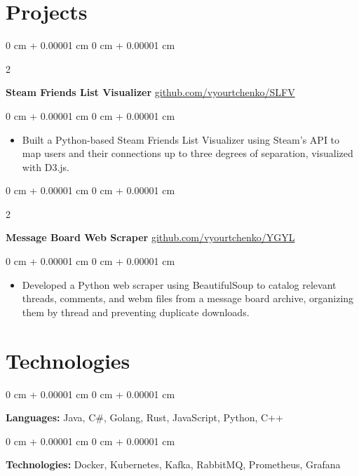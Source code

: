 \documentclass[10pt, letterpaper]{article}
\newenvironment{highlights}{
    \begin{itemize}[
        topsep=0.10 cm,
        parsep=0.10 cm,
        partopsep=0pt,
        itemsep=0pt,
        leftmargin=0 cm + 10pt
    ]
}{
    \end{itemize}
} %
\newenvironment{onecolentry}{
    \begin{adjustwidth}{
        0 cm + 0.00001 cm
    }{
        0 cm + 0.00001 cm
    }
}{
    \end{adjustwidth}
} %
\newenvironment{twocolentry}[2][]{
    \onecolentry
    \def\secondColumn{#2}
    \setcolumnwidth{\fill, 5 cm}
    \begin{paracol}{2}
}{
    \switchcolumn \raggedleft \secondColumn
    \end{paracol}
    \endonecolentry
} %
\begin{document}
    \section{Projects}



        \begin{twocolentry}{
            \href{https://github.com/vyourtchenko/SLFV}{github.com/vyourtchenko/SLFV}
        }
            \textbf{Steam Friends List Visualizer}\end{twocolentry}

        \vspace{0.10 cm}
        \begin{onecolentry}
            \begin{highlights}
                \item Built a Python-based Steam Friends List Visualizer using Steam's API to map users and their connections up to three degrees of separation, visualized with D3.js.
            \end{highlights}
        \end{onecolentry}


        \vspace{0.2 cm}

        \begin{twocolentry}{
            \href{https://github.com/vyourtchenko/YGYL}{github.com/vyourtchenko/YGYL}
        }
            \textbf{Message Board Web Scraper}\end{twocolentry}

        \vspace{0.10 cm}
        \begin{onecolentry}
            \begin{highlights}
                \item Developed a Python web scraper using BeautifulSoup to catalog relevant threads, comments, and webm files from a message board archive, organizing them by thread and preventing duplicate downloads.
            \end{highlights}
        \end{onecolentry}



    
    \section{Technologies}



        
        \begin{onecolentry}
            \textbf{Languages:} Java, C\#, Golang, Rust, JavaScript, Python, C++
        \end{onecolentry}

        \vspace{0.2 cm}

        \begin{onecolentry}
            \textbf{Technologies:} Docker, Kubernetes, Kafka, RabbitMQ, Prometheus, Grafana
        \end{onecolentry}


    
\end{document}

